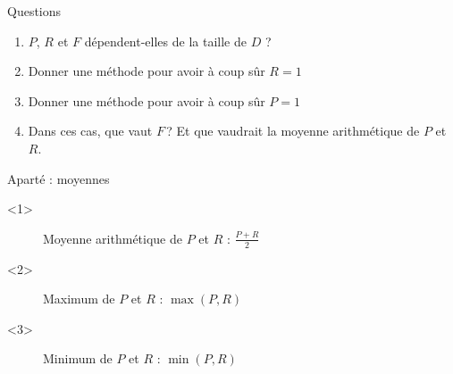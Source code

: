 \documentclass[../allslides.tex]{subfiles}
\begin{document}
\begin{frame}{Questions}
	\begin{enumerate}
		\item $P$, $R$ et $F$ dépendent-elles de la taille de $D$ ?
		\item Donner une méthode pour avoir à coup sûr $R=1$
		\item Donner une méthode pour avoir à coup sûr $P=1$
		\item Dans ces cas, que vaut $F$ ? Et que vaudrait la moyenne arithmétique de $P$ et $R$.
	\end{enumerate}
\end{frame}

\begin{frame}[fragile]{Aparté : moyennes}
	\begin{onlyenv}
		\begin{figure}
			\tikzset{external/export=true}
			\caption{Moyenne arithmétique de $P$ et $R$ : $\frac{P+R}{2}$}
		\end{figure}
	\end{onlyenv}
	\begin{onlyenv}
		\begin{figure}
			\tikzset{external/export=true}
			\caption{Maximum de $P$ et $R$ : $\max(P, R)$}
		\end{figure}
	\end{onlyenv}
	\begin{onlyenv}
		\begin{figure}
			\tikzset{external/export=true}
		\caption{Minimum de $P$ et $R$ : $\min(P, R)$}
		\end{figure}
	\end{onlyenv}

\end{frame}
\end{document}
